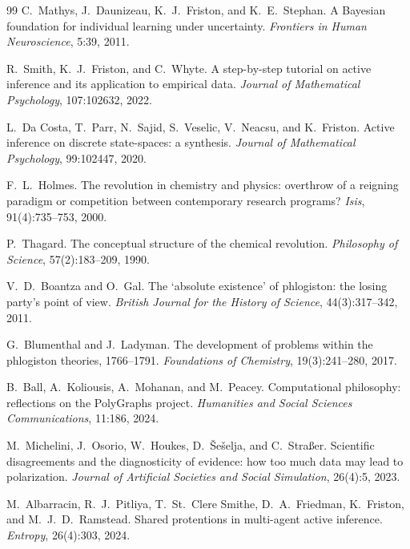 \documentclass[runningheads]{llncs}
\begin{document}
\begin{thebibliography}{99}
C.~Mathys, J.~Daunizeau, K.~J.~Friston, and K.~E.~Stephan.
A Bayesian foundation for individual learning under uncertainty.
\emph{Frontiers in Human Neuroscience}, 5:39, 2011.

R.~Smith, K.~J.~Friston, and C.~Whyte.
A step-by-step tutorial on active inference and its application to empirical data.
\emph{Journal of Mathematical Psychology}, 107:102632, 2022.

L.~Da Costa, T.~Parr, N.~Sajid, S.~Veselic, V.~Neacsu, and K.~Friston.
Active inference on discrete state-spaces: a synthesis.
\emph{Journal of Mathematical Psychology}, 99:102447, 2020.

F.~L.~Holmes.
The revolution in chemistry and physics: overthrow of a reigning paradigm or competition between
contemporary research programs? \emph{Isis}, 91(4):735--753, 2000.

P.~Thagard.
The conceptual structure of the chemical revolution.
\emph{Philosophy of Science}, 57(2):183--209, 1990.

V.~D.~Boantza and O.~Gal.
The `absolute existence' of phlogiston: the losing party's point of view.
\emph{British Journal for the History of Science}, 44(3):317--342, 2011.

G.~Blumenthal and J.~Ladyman.
The development of problems within the phlogiston theories, 1766--1791.
\emph{Foundations of Chemistry}, 19(3):241--280, 2017.

B.~Ball, A.~Koliousis, A.~Mohanan, and M.~Peacey.
Computational philosophy: reflections on the {PolyGraphs} project.
\emph{Humanities and Social Sciences Communications}, 11:186, 2024.

M.~Michelini, J.~Osorio, W.~Houkes, D.~\v{S}e\v{s}elja, and C.~Stra\ss{}er.
Scientific disagreements and the diagnosticity of evidence: how too much data may lead to polarization.
\emph{Journal of Artificial Societies and Social Simulation}, 26(4):5, 2023.

M.~Albarracin, R.~J.~Pitliya, T.~St.~Clere Smithe, D.~A.~Friedman, K.~Friston, and M.~J.~D.~Ramstead.
Shared protentions in multi-agent active inference.
\emph{Entropy}, 26(4):303, 2024.


\end{thebibliography}
\end{document}
